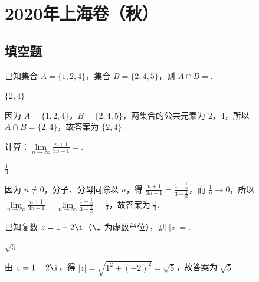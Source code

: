 

\chapter{2020年上海卷（秋）}

\section{填空题}

\begin{problem}
已知集合 \(A=\{1,2,4\}\)，集合 \(B=\{2,4,5\}\)，则 \(A\cap B=\)\fillinblank{}.
\end{problem}

\begin{answer}
\(\{2,4\}\)
\end{answer}

\begin{solution}
因为 \(A=\{1,2,4\}\)，\(B=\{2,4,5\}\)，两集合的公共元素为 \(2\)，\(4\)，所以 \(A\cap B=\{2,4\}\)，故答案为 \(\{2,4\}\).
\end{solution}

\begin{problem}
计算：\(\lim\limits_{n\to\infty}\frac{n+1}{3n-1}=\)\fillinblank{}.
\end{problem}

\begin{answer}
\(\frac13\)
\end{answer}

\begin{solution}
因为 \(n\ne 0\)，分子、分母同除以 \(n\)，得 \(\frac{n+1}{3n-1}=\frac{1+\frac1n}{3-\frac1n}\)，而 \(\frac1n\to 0\)，所以 \(\lim\limits_{n\to\infty}\frac{n+1}{3n-1}=\lim\limits_{n\to\infty}\frac{1+\frac1n}{3-\frac1n}=\frac13\)，故答案为 \(\frac13\).
\end{solution}

\begin{problem}
已知复数 \(z=1-2\i\)（\(\i\) 为虚数单位），则 \(|z|=\)\fillinblank{}.
\end{problem}

\begin{answer}
\(\sqrt5\)
\end{answer}

\begin{solution}
由 \(z=1-2\i\)，得 \(|z|=\sqrt{1^2+(-2)^2}=\sqrt5\)，故答案为 \(\sqrt5\).
\end{solution}

